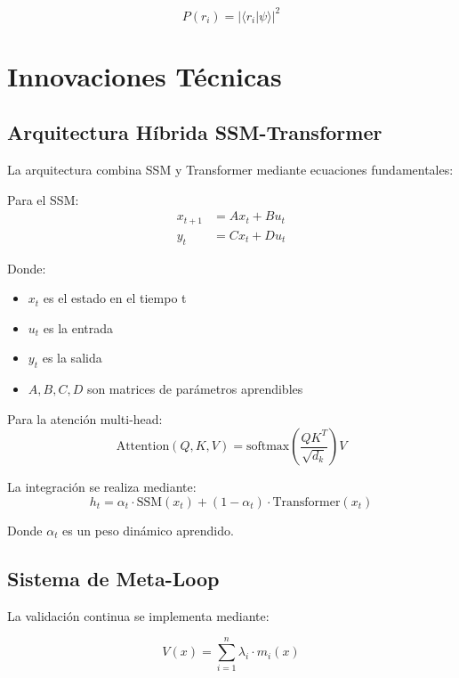 \documentclass[12pt,a4paper]{article}
\begin{document}
\begin{equation}
    P(r_i) = |\langle r_i|\psi\rangle|^2
\end{equation}

\section{Innovaciones Técnicas}

\subsection{Arquitectura Híbrida SSM-Transformer}

La arquitectura combina SSM y Transformer mediante ecuaciones fundamentales:

Para el SSM:
\begin{align}
    x_{t+1} &= Ax_t + Bu_t \\
    y_t &= Cx_t + Du_t
\end{align}

Donde:
\begin{itemize}
    \item $x_t$ es el estado en el tiempo t
    \item $u_t$ es la entrada
    \item $y_t$ es la salida
    \item $A, B, C, D$ son matrices de parámetros aprendibles
\end{itemize}

Para la atención multi-head:
\begin{equation}
    \text{Attention}(Q, K, V) = \text{softmax}\left(\frac{QK^T}{\sqrt{d_k}}\right)V
\end{equation}

La integración se realiza mediante:
\begin{equation}
    h_t = \alpha_t \cdot \text{SSM}(x_t) + (1-\alpha_t) \cdot \text{Transformer}(x_t)
\end{equation}

Donde $\alpha_t$ es un peso dinámico aprendido.

\subsection{Sistema de Meta-Loop}

La validación continua se implementa mediante:

\begin{equation}
    V(x) = \sum_{i=1}^{n} \lambda_i \cdot m_i(x)
\end{equation}
\end{document}
